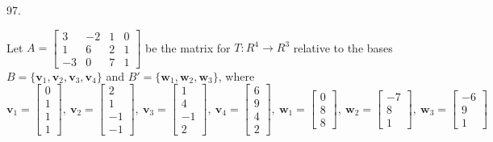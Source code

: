 \documentclass[12pt]{book}
\begin{document}
\begin{CJK}{UTF8}{bsmi}
97. \begin{minipage}[t]{\dimexpr\linewidth-2em}
Let $A=\begin{bmatrix}
3 & -2 & 1 & 0 \\
1 & 6 & 2 & 1 \\
-3 & 0 & 7 & 1
\end{bmatrix}$ be the matrix for $T:R^4\rightarrow R^3$ relative to the bases $B=\{\textbf{v}_1, \textbf{v}
_2, \textbf{v}_3, \textbf{v}_4\}$ and $B'=\{\textbf{w}_1, \textbf{w}
_2, \textbf{w}_3\}$, where \\ $\textbf{v}_1=\begin{bmatrix}
0\\1\\1\\1
\end{bmatrix},\ \textbf{v}_2=\begin{bmatrix}
2\\1\\-1\\-1
\end{bmatrix},\ \textbf{v}_3=\begin{bmatrix}
1\\4\\-1\\2
\end{bmatrix},\ \textbf{v}_4=\begin{bmatrix}
6\\9\\4\\2
\end{bmatrix},\ \textbf{w}_1=\begin{bmatrix}
0\\8\\8
\end{bmatrix},\ \textbf{w}_2=\begin{bmatrix}
-7\\8\\1
\end{bmatrix},\ \textbf{w}_3=\begin{bmatrix}
-6\\9\\1
\end{bmatrix}$
\end{minipage}\\


\end{CJK}
\end{document}
